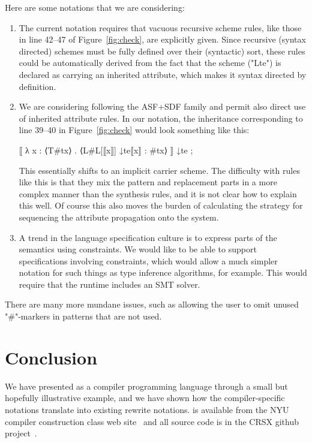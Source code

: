 \documentclass[letterpaper]{llncs}
\begin{document}
Here are some notations that we are considering:
\begin{enumerate}[resume]

\item The current notation requires that vacuous recursive scheme rules, like those in line 42--47
  of Figure~\ref{fig:check}, are explicitly given. Since recursive (syntax directed) schemes must be
  fully defined over their (syntactic) sort, these rules could be automatically derived from the
  fact that the scheme ("Lte") is declared as carrying an inherited attribute, which makes it syntax
  directed by definition.

\item We are considering following the ASF+SDF family and permit also direct use of inherited
  attribute rules. In our notation, the inheritance corresponding to line 39--40 in
  Figure~\ref{fig:check} would look something like this:
  \begin{hacs}
      ⟦ λ x : ⟨T#tx⟩ . ⟨L#L[⟦x⟧]  ↓te{⟦x⟧ : #tx}⟩ ⟧   ↓te ;
  \end{hacs}
  This essentially shifts to an implicit carrier scheme. The difficulty with rules like this is that
  they mix the pattern and replacement parts in a more complex manner than the synthesis rules, and
  it is not clear how to explain this well. Of course this also moves the burden of calculating the
  strategy for sequencing the attribute propagation onto the system.

\item A trend in the language specification culture is to express parts of the semantics using
  constraints. We would like \HAX to be able to support specifications involving constraints, which
  would allow a much simpler notation for such things as type inference algorithms, for
  example. This would require that the runtime includes an SMT solver.

\end{enumerate}
There are many more mundane issues, such as allowing the user to omit unused "#"-markers in patterns
that are not used.


\section{Conclusion}
\label{sec:conc}

We have presented \HAX as a compiler programming language through a small but hopefully illustrative
example, and we have shown how the compiler-specific notations translate into existing rewrite
notations. \HAX is available from the NYU compiler construction class web
site~\cite{RoseRose:cims2015} and all source code is in the CRSX github project~\cite{crsx}.
\end{document}
